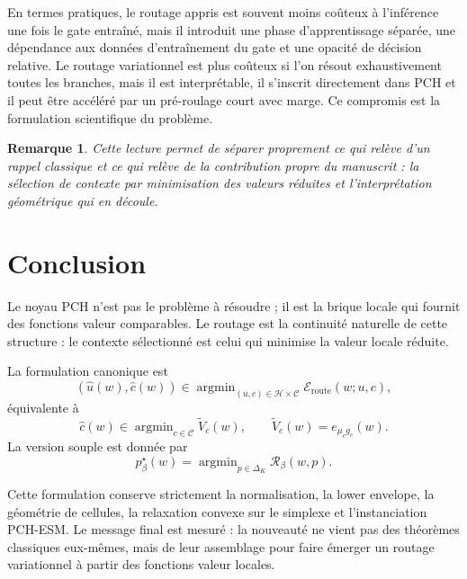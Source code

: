 \documentclass[11pt,a4paper]{article}
\newtheorem{remark}{Remarque}[section]
\DeclareMathOperator{\argmin}{argmin}
\newcommand{\Hh}{\mathcal H}
\newcommand{\Ccal}{\mathcal C}
\newcommand{\Rcal}{\mathcal R}
\begin{document}
En termes pratiques, le routage appris est souvent moins coûteux à l'inférence une fois le gate entraîné, mais il introduit une phase d'apprentissage séparée, une dépendance aux données d'entraînement du gate et une opacité de décision relative. Le routage variationnel est plus coûteux si l'on résout exhaustivement toutes les branches, mais il est interprétable, il s'inscrit directement dans PCH et il peut être accéléré par un pré-roulage court avec marge. Ce compromis est la formulation scientifique du problème.

\begin{remark}
Cette lecture permet de séparer proprement ce qui relève d'un rappel classique et ce qui relève de la contribution propre du manuscrit : la sélection de contexte par minimisation des valeurs réduites et l'interprétation géométrique qui en découle.
\end{remark}

\section{Conclusion}

Le noyau PCH n'est pas le problème à résoudre ; il est la brique locale qui fournit des fonctions valeur comparables. Le routage est la continuité naturelle de cette structure : le contexte sélectionné est celui qui minimise la valeur locale réduite.

La formulation canonique est
\[
(\hat u(w),\hat c(w))\in\argmin_{(u,c)\in\Hh\times\Ccal}\mathcal E_{\mathrm{route}}(w;u,c),
\]
équivalente à
\[
\hat c(w)\in\argmin_{c\in\Ccal}\widetilde V_c(w),
\qquad
\widetilde V_c(w)=e_{\mu_c g_c}(w).
\]
La version souple est donnée par
\[
p^\star_\beta(w)=\argmin_{p\in\Delta_K}\Rcal_\beta(w,p).
\]

Cette formulation conserve strictement la normalisation, la lower envelope, la géométrie de cellules, la relaxation convexe sur le simplexe et l'instanciation PCH-ESM. Le message final est mesuré : la nouveauté ne vient pas des théorèmes classiques eux-mêmes, mais de leur assemblage pour faire émerger un routage variationnel à partir des fonctions valeur locales.
\end{document}
